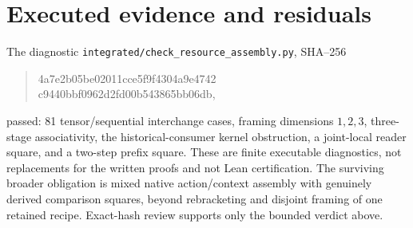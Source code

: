 \documentclass{article}
\begin{document}
\section*{Executed evidence and residuals}
The diagnostic \texttt{integrated/check\_resource\_assembly.py}, SHA--256
\begin{quote}\ttfamily\small
4a7e2b05be02011cce5f9f4304a9e4742\\c9440bbf0962d2fd00b543865bb06db,
\end{quote}
passed: 81 tensor/sequential interchange cases, framing dimensions $1,2,3$, three-stage associativity, the historical-consumer kernel obstruction, a joint-local reader square, and a two-step prefix square. These are finite executable diagnostics, not replacements for the written proofs and not Lean certification. The surviving broader obligation is mixed native action/context assembly with genuinely derived comparison squares, beyond rebracketing and disjoint framing of one retained recipe. Exact-hash review supports only the bounded verdict above.
\end{document}
